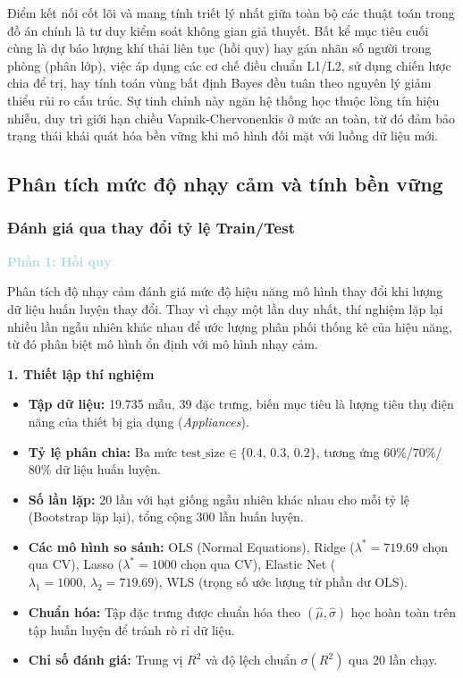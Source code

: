 Điểm kết nối cốt lõi và mang tính triết lý nhất giữa toàn bộ các thuật toán trong đồ án chính là tư duy kiểm soát không gian giả thuyết. Bất kể mục tiêu cuối cùng là dự báo lượng khí thải liên tục (hồi quy) hay gán nhãn số người trong phòng (phân lớp), việc áp dụng các cơ chế điều chuẩn L1/L2, sử dụng chiến lược chia để trị, hay tính toán vùng bất định Bayes đều tuân theo nguyên lý giảm thiểu rủi ro cấu trúc. Sự tinh chỉnh này ngăn hệ thống học thuộc lòng tín hiệu nhiễu, duy trì giới hạn chiều Vapnik-Chervonenkis ở mức an toàn, từ đó đảm bảo trạng thái khái quát hóa bền vững khi mô hình đối mặt với luồng dữ liệu mới.

\subsection{Phân tích mức độ nhạy cảm và tính bền vững}
\subsubsection{Đánh giá qua thay đổi tỷ lệ Train/Test}

\vspace{0.5em}
\noindent\textcolor{lightblue}{\textbf{Phần 1: Hồi quy}}
\vspace{0.5em}

Phân tích độ nhạy cảm đánh giá mức độ hiệu năng mô hình thay đổi khi lượng dữ liệu huấn luyện thay đổi.
Thay vì chạy một lần duy nhất, thí nghiệm lặp lại nhiều lần ngẫu nhiên khác nhau
để ước lượng phân phối thống kê của hiệu năng, từ đó phân biệt mô hình ổn định với mô hình nhạy cảm.

\textbf{1. Thiết lập thí nghiệm}

\begin{itemize}
    \item \textbf{Tập dữ liệu:} 19.735 mẫu, 39 đặc trưng, biến mục tiêu là lượng tiêu thụ điện năng của thiết bị gia dụng (\textit{Appliances}).
    \item \textbf{Tỷ lệ phân chia:} Ba mức $\text{test\_size} \in \{0.4,\, 0.3,\, 0.2\}$, tương ứng $60\%$/$70\%$/$80\%$ dữ liệu huấn luyện.
    \item \textbf{Số lần lặp:} 20 lần với hạt giống ngẫu nhiên khác nhau cho mỗi tỷ lệ (Bootstrap lặp lại), tổng cộng 300 lần huấn luyện.
    \item \textbf{Các mô hình so sánh:} OLS (Normal Equations), Ridge ($\lambda^* = 719.69$ chọn qua CV), Lasso ($\lambda^* = 1000$ chọn qua CV), Elastic Net ($\lambda_1 = 1000,\, \lambda_2 = 719.69$), WLS (trọng số ước lượng từ phần dư OLS).
    \item \textbf{Chuẩn hóa:} Tập đặc trưng được chuẩn hóa theo $(\hat{\mu}, \hat{\sigma})$ học hoàn toàn trên tập huấn luyện để tránh rò rỉ dữ liệu.
    \item \textbf{Chỉ số đánh giá:} Trung vị $R^2$ và độ lệch chuẩn $\sigma(R^2)$ qua 20 lần chạy.
\end{itemize}

